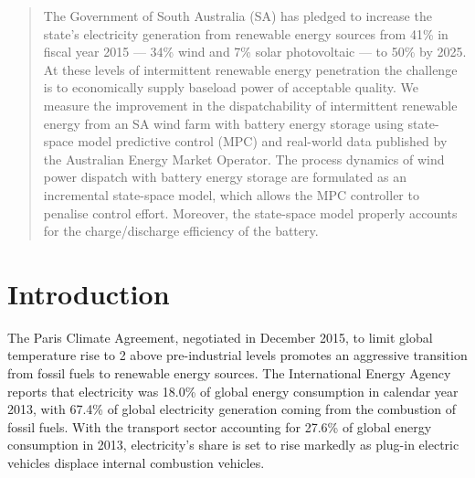 \begin{abstract}
The Government of South Australia (SA) has pledged to increase the state's electricity generation from renewable energy sources from 41\% in fiscal year 2015 --- 34\% wind and 7\% solar photovoltaic --- to 50\% by 2025.  At these levels of intermittent renewable energy penetration the challenge is to economically supply baseload power of acceptable quality.  We measure the improvement in the dispatchability of intermittent renewable energy from an SA wind farm with battery energy storage using state-space model predictive control (MPC) and real-world data published by the Australian Energy Market Operator.  The process dynamics of wind power dispatch with battery energy storage are formulated as an incremental state-space model, which allows the MPC controller to penalise control effort.  Moreover, the state-space model properly accounts for the charge/discharge efficiency of the battery.  
\end{abstract}

\section{Introduction}\label{sect:introduction}
The Paris Climate Agreement, negotiated in December 2015, to limit global temperature rise to 2 \textcelsius{} above pre-industrial levels promotes an aggressive transition from fossil fuels to renewable energy sources.  The International Energy Agency \citeyearpar[IEA,][]{IEA15} reports that electricity was 18.0\% of global energy consumption in calendar year 2013, with 67.4\% of global electricity generation coming from the combustion of fossil fuels.  With the transport sector accounting for 27.6\% of global energy consumption in 2013, electricity's share is set to rise markedly as plug-in electric vehicles displace internal combustion vehicles.

